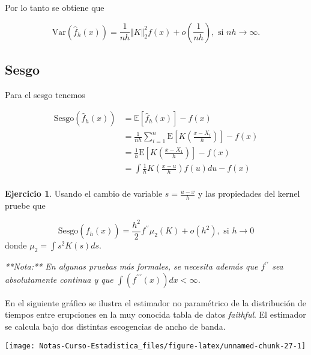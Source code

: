 \documentclass[
  12pt,
]{book}
\theoremstyle{definition}
\theoremstyle{definition}
\theoremstyle{definition}
\newtheorem{exercise}{Ejercicio}[chapter]
\theoremstyle{definition}
\theoremstyle{remark}
\begin{document}
Por lo tanto se obtiene que

\begin{equation*}
\mathrm{Var}\left(\hat{f}_{h}(x)\right) = \frac{1}{nh} \Vert K\Vert_{2}^{2}f(x) + o\left(\frac{1}{nh}\right), \text{ si } nh\to \infty.
\end{equation*}

\hypertarget{sesgo-1}{%
\subsection{Sesgo}\label{sesgo-1}}

Para el sesgo tenemos

\begin{align*}
\mathrm{Sesgo}\left(\hat{f}_{h}(x)\right)
& = \mathbb{E}\left[\hat{f}_{h}(x)\right]-f(x)                                                  \\
& = \frac{1}{nh} \sum_{i=1}^{n} \mathrm{E}\left[K\left( \frac{x-X_{i}}{h} \right)\right] - f(x) \\
& = \frac{1}{h}\mathrm{E}\left[K\left( \frac{x-X_{1}}{h} \right)\right] - f(x)                  \\
& = \int \frac{1}{h} K\left( \frac{x-u}{h}\right)f(u)du -f(x)                                   \\
\end{align*}

\begin{exercise}
\protect\hypertarget{exr:unnamed-chunk-25}{}\label{exr:unnamed-chunk-25}Usando el cambio de variable \(s=\frac{u-x}{h}\) y las propiedades del kernel pruebe que

\begin{equation*}
\mathrm{Sesgo}\left(\hat{f}_{h}(x)\right) = \frac{h^{2}}{2} f^{\prime\prime} \mu_{2}(K) + o(h^{2}), \text{ si } h\to 0
\end{equation*}
donde \(\mu_{2}=\int s^{2}K(s)ds\).

\emph{**Nota:** En algunas pruebas más formales, se necesita
además que  $f^{\prime\prime}$ sea absolutamente continua y que
$\int(f^{\prime\prime\prime}(x))dx<\infty$.}
\end{exercise}

En el siguiente gráfico se ilustra el estimador no paramétrico de la distribución de tiempos entre erupciones en la muy conocida tabla de datos \emph{faithful}. El estimador se calcula bajo dos distintas escogencias de ancho de banda.

\begin{center}\texttt{[image: Notas-Curso-Estadistica\_files/figure-latex/unnamed-chunk-27-1]} \end{center}
\end{document}
